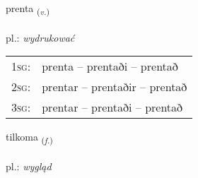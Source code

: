 \documentclass[frontgrid, backgrid]{flacards}\usepackage[]{graphicx}\usepackage[]{xcolor}
\begin{document}
\renewcommand{\flhead}{\vskip5pt \fboxsep=0pt {\small\bfseries\footnotesize Sagnorð | czasownik}}
\renewcommand{\fcfoot}{\vskip5pt \fboxsep=0pt \hspace{2pt}{\small\bfseries\footnotesize 3K}}

\renewcommand{\blhead}{\vskip5pt {\small\bfseries\footnotesize Sagnorð | czasownik }}
\renewcommand{\bcfoot}{\vskip5pt \hspace{2pt}{\small\bfseries\footnotesize 3K}}


{prenta \small{\textsubscript{(\textit{v.})}} \\[1ex] %
\textphonetic{[pʰrɛn̥ta]} \\
pl.: \emph{wydrukować} \\  [2ex]
\renewcommand*{\arraystretch}{0.8}
\begin{tabular}{p{1cm}l}
\textsc{1sg}: & prenta -- prentaði -- prentað \\ 
\textsc{2sg}: & prentar -- prentaðir -- prentað \\ 
\textsc{3sg}: & prentar -- prentaði -- prentað \\ 
\end{tabular}
}

\renewcommand{\flhead}{\vskip5pt \fboxsep=0pt {\small\bfseries\footnotesize Nafnorð | rzeczownik}}
\renewcommand{\fcfoot}{\vskip5pt \fboxsep=0pt \hspace{2pt}{\small\bfseries\footnotesize 3K}}

\renewcommand{\blhead}{\vskip5pt {\small\bfseries\footnotesize Nafnorð | rzeczownik }}
\renewcommand{\bcfoot}{\vskip5pt \hspace{2pt}{\small\bfseries\footnotesize 3K}}


{tilkoma \small{\textsubscript{(\textit{f.})}} \\[1ex] %
\textphonetic{[tʰɪlkʰɔma]} \\
pl.: \emph{wygląd} \\  [2ex]
\renewcommand*{\arraystretch}{0.8}
}
\end{document}
